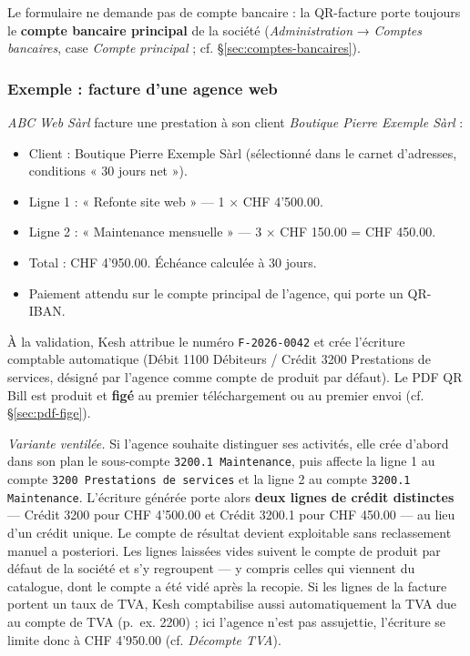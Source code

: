 \documentclass[a4paper,11pt,oneside]{article}
\begin{document}
Le formulaire ne demande pas de compte bancaire : la QR-facture porte toujours le \textbf{compte bancaire principal} de la société (\emph{Administration} → \emph{Comptes bancaires}, case \emph{Compte principal} ; cf. \S\ref{sec:comptes-bancaires}).

\subsubsection{Exemple : facture d'une agence web}

\emph{ABC Web Sàrl} facture une prestation à son client \emph{Boutique Pierre Exemple Sàrl} :

\begin{itemize}
    \item Client : Boutique Pierre Exemple Sàrl (sélectionné dans le carnet d'adresses, conditions « 30 jours net »).
    \item Ligne 1 : « Refonte site web » — 1 × CHF 4'500.00.
    \item Ligne 2 : « Maintenance mensuelle » — 3 × CHF 150.00 = CHF 450.00.
    \item Total : CHF 4'950.00. Échéance calculée à 30 jours.
    \item Paiement attendu sur le compte principal de l'agence, qui porte un QR-IBAN.
\end{itemize}

À la validation, Kesh attribue le numéro \texttt{F-2026-0042} et crée l'écriture comptable automatique (Débit 1100 Débiteurs / Crédit 3200 Prestations de services, désigné par l'agence comme compte de produit par défaut). Le PDF QR Bill est produit et \textbf{figé} au premier téléchargement ou au premier envoi (cf. \S\ref{sec:pdf-fige}).

\medskip
\noindent\emph{Variante ventilée.} Si l'agence souhaite distinguer ses activités, elle crée d'abord dans son plan le sous-compte \texttt{3200.1 Maintenance}, puis affecte la ligne 1 au compte \texttt{3200 Prestations de services} et la ligne 2 au compte \texttt{3200.1 Maintenance}. L'écriture générée porte alors \textbf{deux lignes de crédit distinctes} — Crédit 3200 pour CHF 4'500.00 et Crédit 3200.1 pour CHF 450.00 — au lieu d'un crédit unique. Le compte de résultat devient exploitable sans reclassement manuel a posteriori. Les lignes laissées vides suivent le compte de produit par défaut de la société et s'y regroupent — y compris celles qui viennent du catalogue, dont le compte a été vidé après la recopie. Si les lignes de la facture portent un taux de TVA, Kesh comptabilise aussi automatiquement la TVA due au compte de TVA (p.~ex. 2200) ; ici l'agence n'est pas assujettie, l'écriture se limite donc à CHF 4'950.00 (cf. \emph{Décompte TVA}).
\end{document}
